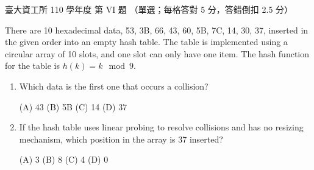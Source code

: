 \begin{pastexam}[label={px:ntu-110-dsaa-06}]{臺大資工所 110 學年度 第 VI 題}
（單選；每格答對 5 分，答錯倒扣 2.5 分）

There are 10 hexadecimal data, 53, 3B, 66, 43, 60, 5B, 7C, 14, 30, 37, inserted in the given
order into an empty hash table. The table is implemented using a circular array of 10 slots, and
one slot can only have one item. The hash function for the table is $h(k)=k \mod 9$.
\begin{enumerate}[label=(\alph*)]
\item Which data is the first one that occurs a collision? \underline{}

(A) 43 \qquad (B) 5B \qquad (C) 14 \qquad (D) 37
\item If the hash table uses linear probing to resolve collisions and has no resizing
mechanism, which position in the array is 37 inserted? \underline{}

(A) 3 \qquad (B) 8 \qquad (C) 4 \qquad (D) 0
\end{enumerate}
\end{pastexam}

